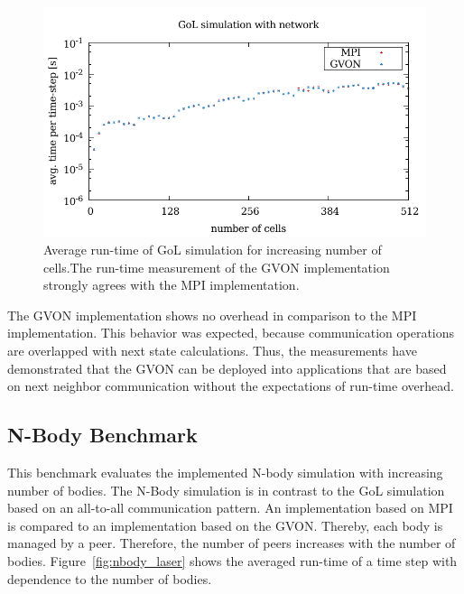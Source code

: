 \begin{figure}[H]
  \includegraphics[width=\textwidth]{plots/50_gol_network_laser}
  \caption{Average run-time of GoL simulation for increasing number of
    cells.The run-time measurement of the GVON implementation strongly
    agrees with the MPI implementation.}
  \label{fig:gol_laser}
\end{figure}

\noindent The GVON implementation shows no overhead in comparison to
the MPI implementation. This behavior was expected, because
communication operations are overlapped with next state calculations.
Thus, the measurements have demonstrated that the GVON can be deployed
into applications that are based on next neighbor communication
without the expectations of run-time overhead.


\subsection{N-Body Benchmark}
This benchmark evaluates the implemented N-body simulation with
increasing number of bodies. The N-Body simulation is in contrast to
the GoL simulation based on an all-to-all communication pattern. An
implementation based on MPI is compared to an implementation based on
the GVON. Thereby, each body is managed by a peer. Therefore, the
number of peers increases with the number of
bodies. Figure~\ref{fig:nbody_laser} shows the averaged run-time of a
time step with dependence to the number of bodies.

